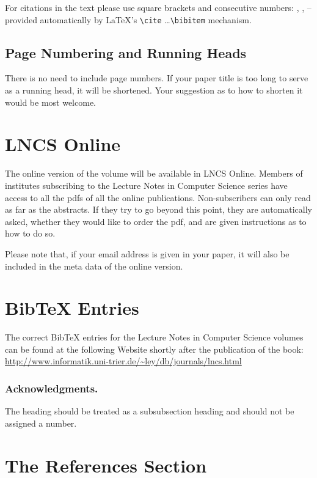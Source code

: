 \documentclass[runningheads,a4paper]{llncs}
\begin{document}
For citations in the text please use
square brackets and consecutive numbers: \cite{jour}, \cite{lncschap},
\cite{proceeding1} -- provided automatically
by \LaTeX 's \verb|\cite| \dots\verb|\bibitem| mechanism.

\subsection{Page Numbering and Running Heads}

There is no need to include page numbers. If your paper title is too
long to serve as a running head, it will be shortened. Your suggestion
as to how to shorten it would be most welcome.

\section{LNCS Online}

The online version of the volume will be available in LNCS Online.
Members of institutes subscribing to the Lecture Notes in Computer
Science series have access to all the pdfs of all the online
publications. Non-subscribers can only read as far as the abstracts. If
they try to go beyond this point, they are automatically asked, whether
they would like to order the pdf, and are given instructions as to how
to do so.

Please note that, if your email address is given in your paper,
it will also be included in the meta data of the online version.

\section{BibTeX Entries}

The correct BibTeX entries for the Lecture Notes in Computer Science
volumes can be found at the following Website shortly after the
publication of the book:
\url{http://www.informatik.uni-trier.de/~ley/db/journals/lncs.html}

\subsubsection*{Acknowledgments.} The heading should be treated as a
subsubsection heading and should not be assigned a number.

\section{The References Section}\label{references}
\end{document}
